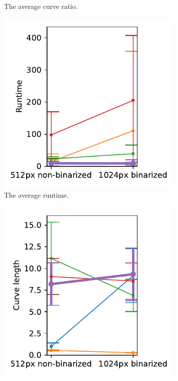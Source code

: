 \begin{figure}[h]
\begin{subfigure}{.3\textwidth}
    \caption{The average curve ratio.}
\end{subfigure}
    \begin{subfigure}{.3\textwidth}
    \centering
    \includegraphics[width=\textwidth]{graphics/eval/runtime_res_binarization_tonari.pdf}
    \caption{The average runtime.}
\end{subfigure}
    \begin{subfigure}{.3\textwidth}
    \centering
    \includegraphics[width=\textwidth]{graphics/eval/curve length_res_binarization_tonari.pdf}

\end{subfigure}
\end{figure}
